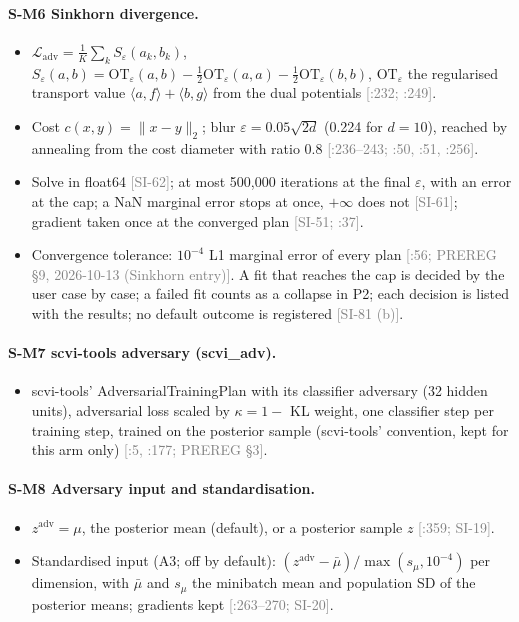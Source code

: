 \documentclass[11pt]{article}
\newcommand{\src}[1]{{\scriptsize\textcolor{gray}{[#1]}}}
\begin{document}
\paragraph{S-M6 Sinkhorn divergence.}
\begin{itemize}
\item $\mathcal{L}_{\mathrm{adv}} = \frac{1}{K}\sum_k S_\varepsilon(a_k, b_k)$, $S_\varepsilon(a, b) = \mathrm{OT}_\varepsilon(a, b) - \frac{1}{2}\mathrm{OT}_\varepsilon(a, a) - \frac{1}{2}\mathrm{OT}_\varepsilon(b, b)$, $\mathrm{OT}_\varepsilon$ the regularised transport value $\langle a, f\rangle + \langle b, g\rangle$ from the dual potentials \src{:232; \file{wcd/alignment.py}:249}.
\item Cost $c(x, y) = \|x - y\|_2$; blur $\varepsilon = 0.05\sqrt{2d}$ (0.224 for $d = 10$), reached by annealing from the cost diameter with ratio 0.8 \src{:236--243; \file{wcd/alignment.py}:50, :51, :256}.
\item Solve in float64 \src{SI-62}; at most 500,000 iterations at the final $\varepsilon$, with an error at the cap; a NaN marginal error stops at once, $+\infty$ does not \src{SI-61}; gradient taken once at the converged plan \src{SI-51; :37}.
\item Convergence tolerance: $10^{-4}$ L1 marginal error of every plan \src{:56; PREREG \S9, 2026-10-13 (Sinkhorn entry)}. A fit that reaches the cap is decided by the user case by case; a failed fit counts as a collapse in P2; each decision is listed with the results; no default outcome is registered \src{SI-81 (b)}.
\end{itemize}
\paragraph{S-M7 scvi-tools adversary (scvi\_adv).}
\begin{itemize}
\item scvi-tools' AdversarialTrainingPlan with its classifier adversary (32 hidden units), adversarial loss scaled by $\kappa = 1 -$ KL weight, one classifier step per training step, trained on the posterior sample (scvi-tools' convention, kept for this arm only) \src{:5, :177; PREREG \S3}.
\end{itemize}
\paragraph{S-M8 Adversary input and standardisation.}
\begin{itemize}
\item $z^{\mathrm{adv}} = \mu$, the posterior mean (default), or a posterior sample $z$ \src{:359; SI-19}.
\item Standardised input (A3; off by default): $(z^{\mathrm{adv}} - \bar\mu)/\max(s_\mu, 10^{-4})$ per dimension, with $\bar\mu$ and $s_\mu$ the minibatch mean and population SD of the posterior means; gradients kept \src{:263--270; SI-20}.
\end{itemize}
\end{document}
